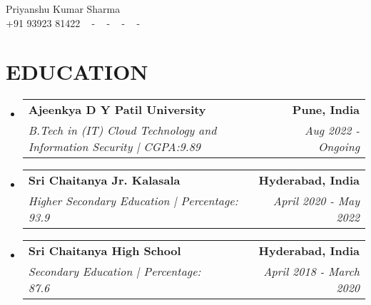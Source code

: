 \documentclass[letterpaper,11pt]{article}
\makeatletter
\newcommand{\resumeSubheading}[4]{
  \vspace{-2pt}\item
    \begin{tabular*}{1.0\textwidth}[t]{l@{\extracolsep{\fill}}r}
      \textbf{\large#1} & \textbf{\small #2} \\
      \textit{\large#3} & \textit{\small #4} \\
      
    \end{tabular*}\vspace{-7pt}
}
\newcommand{\resumeSubHeadingListStart}{\begin{itemize}[leftmargin=0.0in, label={}]}
\newcommand{\resumeSubHeadingListEnd}{\end{itemize}}
\makeatother
\begin{document}


\begin{center}
    {\huge Priyanshu Kumar Sharma} \\ \vspace{2pt} 
    {+91 93923 81422} ~ 
    \small{-}
    \href{priyanshu17ks@gmail.com}{\color{blue}{priyanshu17ks@gmail.com}} ~ 
    \small{-}
    \href{https://www.linkedin.com/in/priyanshu-kumar-sharma-333800251/}{ \color{blue}{LinkedIn}}  ~
    \small{-}
    \href{https://github.com/PriyanshuKSharma/}{ \color{blue}{GitHub}} ~
    \small{-}
    \href{https://hub.docker.com/u/priyanshuksharma}{\color{blue}{DockerHub}} ~
    \vspace{-7pt}
\end{center}

\section{\color{airforceblue}EDUCATION}
  \resumeSubHeadingListStart
    \resumeSubheading
      {Ajeenkya D Y Patil University}{Pune, India}
      {B.Tech in (IT) Cloud Technology and Information Security {| CGPA:9.89}}{Aug 2022 - Ongoing}
    \vspace{-4pt}
     \resumeSubheading
      {Sri Chaitanya Jr. Kalasala}{Hyderabad, India}
      {Higher Secondary Education {| Percentage: 93.9}}{April 2020 - May 2022}
    \vspace{-4pt}
     \resumeSubheading
      {Sri Chaitanya High School}{Hyderabad, India}
      {Secondary Education {| Percentage: 87.6}}{April 2018 - March 2020}

    
  \resumeSubHeadingListEnd
  \vspace{-10pt}

\end{document}
